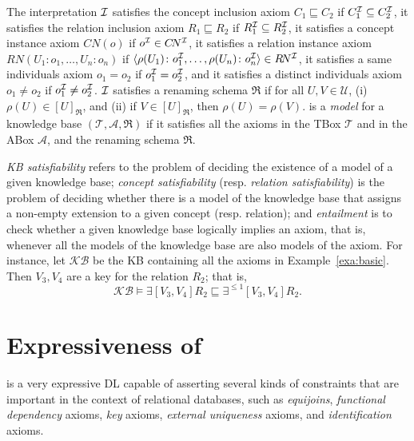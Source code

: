 \documentclass[envcountsame,draft]{llncs}
\newcommand{\Int}[1]{#1^{\Imc}\xspace}
\newcommand{\per}{\mathpunct{\mbox{\bf .}}}
\begin{document}
The interpretation $\mathcal{I}$ satisfies the concept inclusion axiom
$C_1\sqsubseteq C_2$ if $\Int C_1\subseteq \Int C_2$, it satisfies the
relation inclusion axiom $R_1\sqsubseteq R_2$ if
$\Int R_1\subseteq \Int R_2$, it satisfies a concept instance axiom
$C\!N(o)$ if $\Int o\in \Int {C\!N}$, it satisfies a relation instance
axiom $R\!N(U_1\!:\!o_1,\ldots,U_n\!:\!o_n)$ if
${\langle
  \rho(U_1)\colon\Int{o_1},\ldots,\rho(U_n)\colon\Int{o_n}\rangle}\in
\Int {R\!N}$, it satisfies a same individuals axiom $o_1 = o_2$ if
$\Int{o_1} = \Int{o_2}$, and it satisfies a distinct individuals axiom
$o_1 \neq o_2$ if $\Int{o_1} \neq \Int{o_2}$.  $\mathcal{I}$ satisfies a
renaming schema $\Re$ if
for all $U,V\in\mathcal{U}$, (i) $\rho(U)\in[U]_\Re$, and (ii) if $V\in [U]_\Re$, then $\rho(U)=\rho(V)$.
\Imc is a \emph{model} for a knowledge base $(\mathcal{T}\!,\mathcal{A},\Re)$ if it satisfies all the axioms in the 
TBox $\mathcal{T}$ and in the ABox $\mathcal{A}$, and the renaming schema $\Re$. 

\emph{KB satisfiability} refers to the problem of deciding the existence of a model of a given knowledge base;
\emph{concept satisfiability} (resp. \emph{relation satisfiability}) is the problem of deciding whether there is a model of 
the knowledge base that assigns a non-empty extension to a given concept (resp. relation); and 
\emph{entailment} is to check whether a given knowledge base logically implies an axiom, that is, whenever all the models of the knowledge base are also models of the axiom.
%
For instance, let $\mathcal{KB}$ be the KB containing all the axioms in Example~\ref{exa:basic}. Then
$V_3,V_4$ are a key for the relation $R_2$; that is,
%
\[
  \mathcal{KB}\models \exists[V_3,V_4] R_2 \sqsubseteq \exists^{\leq 1}[V_3,V_4] R_2.
\]
%


\section{Expressiveness of \DLRp}

\DLRp is a very expressive DL capable of asserting several kinds of constraints that are important in the context of relational databases, such as \emph{equijoins}, \emph{functional dependency} axioms, \emph{key} axioms, \emph{external uniqueness} axioms, and \emph{identification} axioms.
\end{document}
